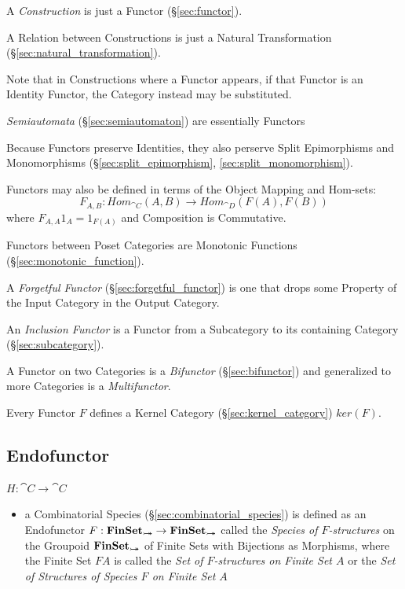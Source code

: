 A \emph{Construction} is just a Functor (\S\ref{sec:functor}).

A Relation between Constructions is just a Natural Transformation
(\S\ref{sec:natural_transformation}).

\fist Note that in Constructions where a Functor appears, if
that Functor is an Identity Functor, the Category instead may be
substituted.

\fist \emph{Semiautomata} (\S\ref{sec:semiautomaton}) are essentially
Functors

Because Functors preserve Identities, they also perserve Split
Epimorphisms and Monomorphisms (\S\ref{sec:split_epimorphism},
\ref{sec:split_monomorphism}).

Functors may also be defined in terms of the Object Mapping and
Hom-sets:
\[
  F_{A,B} : Hom_{\cat{C}}(A,B) \rightarrow Hom_{\cat{D}}(F(A),F(B))
\]
where $F_{A,A}1_A = 1_{F(A)}$ and Composition is Commutative.

Functors between Poset Categories are Monotonic Functions
(\S\ref{sec:monotonic_function}).

A \emph{Forgetful Functor} (\S\ref{sec:forgetful_functor}) is one that
drops some Property of the Input Category in the Output Category.

An \emph{Inclusion Functor} is a Functor from a Subcategory to its
containing Category (\S\ref{sec:subcategory}).

A Functor on two Categories is a \emph{Bifunctor}
(\S\ref{sec:bifunctor}) and generalized to more Categories is a
\emph{Multifunctor}.

Every Functor $F$ defines a Kernel Category (\S\ref{sec:kernel_category})
$ker(F)$.



\subsection{Endofunctor}\label{sec:endofunctor}

$H : \cat{C} \rightarrow \cat{C}$

\begin{itemize}
  \item a Combinatorial Species (\S\ref{sec:combinatorial_species}) is defined
    as an Endofunctor $F : \mathbf{FinSet}_{\rightarrowtail\hspace{-8pt}\twoheadrightarrow} \rightarrow
    \mathbf{FinSet}_{\rightarrowtail\hspace{-8pt}\twoheadrightarrow}$ called the \emph{Species of $F$-structures} on the
    Groupoid $\mathbf{FinSet}_{\rightarrowtail\hspace{-8pt}\twoheadrightarrow}$ of Finite Sets with Bijections as
    Morphisms, where the Finite Set $F A$ is called the \emph{Set of
      $F$-structures on Finite Set $A$} or the \emph{Set of Structures of
      Species $F$ on Finite Set $A$}
\end{itemize}



